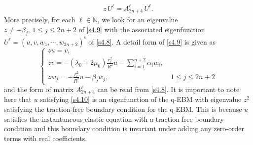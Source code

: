 \documentclass[a4paper,12pt]{article}
\newtheorem{a priori condition}[Th]{A priori condition}
\begin{document}
\begin{equation}\label{s4.9}
\begin{aligned}
z\,U^\ell=A_{2n+4}^\ell\,U^\ell.
\end{aligned}
\end{equation}
More precisely, for each $\ell\in{\mathbb N}$, we look for an eigenvalue $z\not=-\beta_j,\,1\le j\le 2n+2$ of \eqref{s4.9} with the associated eigenfunction $U^\ell=(u,v,w_1,\cdots,w_{2n+2})^{\mathfrak{t}}$ of \eqref{s4.8}. A detail form of \eqref{s4.9} is given as
\begin{equation}\label{s4.10}
\left\{
\begin{array}{ll}
zu=v,\\
zv=-(\lambda_0+2\mu_0)\frac{r_\ell^2}{R^2} u-  \sum_{i=1}^{n+2} \alpha_iw_i,\\
zw_j=-\frac{r_\ell^2}{R^2} u -\beta_jw_j, \qquad\quad&\ 1\leq j \leq 2n+2
\end{array}
\right.
\end{equation}
and the form of matrix $A^\ell_{2n+4}$ can be read from \eqref{s4.8}. It is important to note here that $u$ satisfying \eqref{s4.10} is an eigenfunction of the q-EBM with eigenvalue $z^2$ satisfying the traction-free boundary condition for the q-EBM. This is because $u$ satisfies the instantaneous elastic equation with a traction-free boundary condition and this boundary condition is invariant under adding any zero-order terms with real coefficients. 
\end{document}
